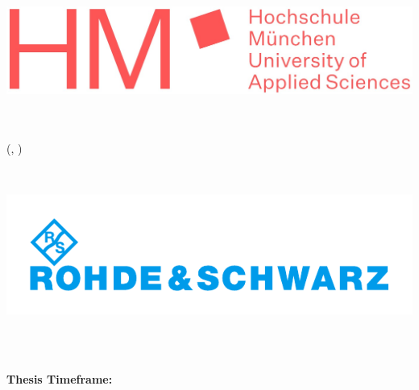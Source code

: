 \begin{titlepage}

    \centering  %

    \includegraphics[width=0.4\linewidth,keepaspectratio]{figures/logos/A_HM_Logo_incl_text.jpg}

    \vspace{0.2cm}

    \Large{\textcolor{HMColor}{\university}}\\  %
    \small{\uniDepartment}\\
    \small{(\universityGer, \uniDepartmentGer)}\\

    \vspace{0.4cm}  %

    {\color{RSColor}\bfseries\huge{\thesisTitle} \par}
    \small{\thesisTitleGer}\\

    \vspace{0.4cm}  %

    \Large\textbf{\authorName}

    \vspace{0.5cm}  %

    \includegraphics[width=0.4\linewidth,keepaspectratio]{figures/logos/X_logo_RS.pdf}

    \vspace{0.2cm}

    \normalsize{\textcolor{RSColor}{\company}}\\  %
    \small{\compDepartment}\\

    \vspace{0.2cm}

    \small\textbf{Thesis Timeframe:} \projectDuration \\


\end{titlepage}
